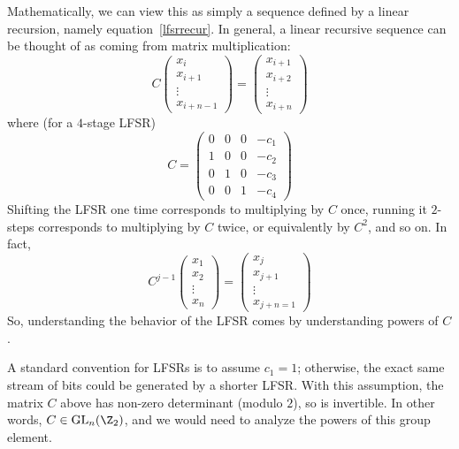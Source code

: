 \documentclass[12pt]{amsart}
\DeclareMathOperator{\GL}{GL}
\theoremstyle{plain}
\theoremstyle{definition}
\theoremstyle{remark}
\begin{document}
Mathematically, we can view this as simply a sequence defined by a
linear recursion, namely equation~\eqref{lfsrrecur}.  In general, a
linear recursive sequence can be thought of as coming from matrix
multiplication:
\[ C 
\begin{pmatrix} x_i \\ x_{i+1} \\ \vdots \\ x_{i+n-1} \end{pmatrix} =
\begin{pmatrix} x_{i+1} \\ x_{i+2} \\ \vdots \\ x_{i+n} \end{pmatrix}
\]
where (for a $4$-stage LFSR)
\[ C = \begin{pmatrix} 0 & 0 & 0 & -c_1 \\
1 & 0  & 0 & -c_2 \\
0 & 1  & 0 & -c_3 \\
0 & 0 & 1 & -c_4 
\end{pmatrix}
\]
Shifting the LFSR one time corresponds to multiplying by $C$ once,
running it $2$-steps corresponds to multiplying by $C$ twice, or
equivalently by $C^2$, and so on.  In fact,
\[ C^{j-1}
\begin{pmatrix} x_1 \\ x_{2} \\ \vdots \\ x_{n} \end{pmatrix} =
\begin{pmatrix} x_{j} \\ x_{j+1} \\ \vdots \\ x_{j+n=1} \end{pmatrix}
\]
So, understanding the behavior of the LFSR comes by understanding
powers of $C$.

A standard convention for LFSRs is to assume $c_1=1$; otherwise, the
exact same stream of bits could be generated by a shorter LFSR.  With
this assumption, the matrix $C$ above has non-zero determinant (modulo
$2$), so is invertible.  In other words, $C\in \GL_n(\Z_2)$, and we
would need to analyze the powers of this group element.
\end{document}
